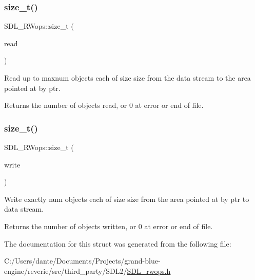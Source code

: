 \subsubsection{\texorpdfstring{size\_t()}{size\_t()}\hspace{0.1cm}{\footnotesize\ttfamily [1/2]}}
{\footnotesize\ttfamily S\+D\+L\+\_\+\+R\+Wops\+::size\+\_\+t (\begin{DoxyParamCaption}\item[{S\+D\+L\+C\+A\+LL $\ast$}]{read }\end{DoxyParamCaption})}

Read up to {\ttfamily maxnum} objects each of size {\ttfamily size} from the data stream to the area pointed at by {\ttfamily ptr}.

\begin{DoxyReturn}{Returns}
the number of objects read, or 0 at error or end of file. 
\end{DoxyReturn}
\mbox{\label{struct_s_d_l___r_wops_a5f12fd517afffba5bfaff4643d6792b1}} 
\subsubsection{\texorpdfstring{size\_t()}{size\_t()}\hspace{0.1cm}{\footnotesize\ttfamily [2/2]}}
{\footnotesize\ttfamily S\+D\+L\+\_\+\+R\+Wops\+::size\+\_\+t (\begin{DoxyParamCaption}\item[{S\+D\+L\+C\+A\+LL $\ast$}]{write }\end{DoxyParamCaption})}

Write exactly {\ttfamily num} objects each of size {\ttfamily size} from the area pointed at by {\ttfamily ptr} to data stream.

\begin{DoxyReturn}{Returns}
the number of objects written, or 0 at error or end of file. 
\end{DoxyReturn}


The documentation for this struct was generated from the following file\+:\begin{DoxyCompactItemize}
\item 
C\+:/\+Users/dante/\+Documents/\+Projects/grand-\/blue-\/engine/reverie/src/third\+\_\+party/\+S\+D\+L2/\mbox{\hyperlink{_s_d_l__rwops_8h}{S\+D\+L\+\_\+rwops.\+h}}\end{DoxyCompactItemize}
